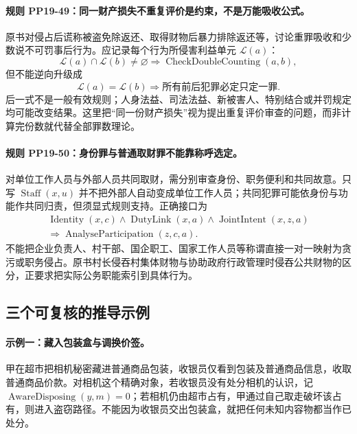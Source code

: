 \paragraph{规则 PP19-49：同一财产损失不重复评价是约束，不是万能吸收公式。}
\mbox{}\par
原书对侵占后谎称被盗免除返还、取得财物后暴力排除返还等，讨论重罪吸收和少数说不可罚事后行为。应记录每个行为所侵害利益单元 $\mathcal L(a)$：
\[
\mathcal L(a)\cap\mathcal L(b)\ne\varnothing
\Rightarrow\operatorname{CheckDoubleCounting}(a,b),
\]
但不能逆向升级成
\[
\mathcal L(a)=\mathcal L(b)\Rightarrow
\text{所有前后犯罪必定只定一罪}.
\]
后一式不是一般有效规则；人身法益、司法法益、新被害人、特别结合或并罚规定均可能改变结果。这里把“同一份财产损失”视为提出重复评价审查的问题，而非计算完份数就代替全部罪数理论。

\paragraph{规则 PP19-50：身份罪与普通取财罪不能靠称呼选定。}
\mbox{}\par
对单位工作人员与外部人员共同取财，需分别审查身份、职务便利和共同故意。只写 $\operatorname{Staff}(x,u)$ 并不把外部人自动变成单位工作人员；共同犯罪可能依身份与功能作共同归责，但须显式规则支持。正确接口为
\[
\begin{gathered}
\operatorname{Identity}(x,c)\land\operatorname{DutyLink}(x,a)
\land\operatorname{JointIntent}(x,z,a)\\
\Rightarrow\operatorname{AnalyseParticipation}(z,c,a).
\end{gathered}
\]
不能把企业负责人、村干部、国企职工、国家工作人员等称谓直接一对一映射为贪污或职务侵占。原书村长侵吞村集体财物与协助政府行政管理时侵吞公共财物的区分，正要求把实际公务职能索引到具体行为。

\subsection{三个可复核的推导示例}
\paragraph{示例一：藏入包装盒与调换价签。}
\mbox{}\par
甲在超市把相机秘密藏进普通商品包装，收银员仅看到包装及普通商品信息，收取普通商品价款。对相机这个精确对象，若收银员没有处分相机的认识，记 $\operatorname{AwareDisposing}(y,m)=0$；若相机仍由超市占有，甲通过自己取走破坏该占有，则进入盗窃路径。不能因为收银员交出包装盒，就把任何未知内容物都当作已处分。

